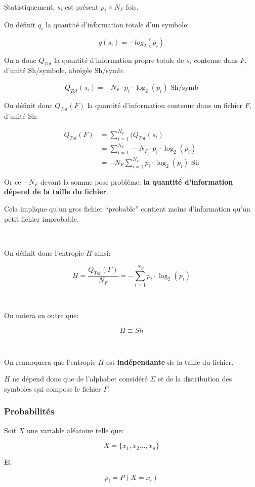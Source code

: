 \documentclass[a4paper,11pt]{article}
\newcommand{\ti}{\cdot}
\begin{document}
Statistiquement, $s_i$ est présent $p_i \times N_F$ fois.

On définit $q_i$ la quantité d'information totale d'un symbole:

$$ q(s_i) = -log_2(p_i) $$

On a donc $Q_{Tot}$ la quantité d'information propre totale de $s_i$ contenue
dans $F$, d'unité Sh/symbole, abrégée Sh/symb:

$$ Q_{Tot}(s_i) = -N_F \cdot p_i \cdot \log_2(p_i) \text{ Sh/symb}$$

On définit donc $Q_{Tot}(F)$ la quantité d'information contenue dans un fichier
$F$, d'unité Sh:

\begin{align*}
  Q_{Tot}(F) &= \sum_{i = 1}^{N_F}(Q_{Tot}(s_i) \\
             &= \sum_{i = 1}^{N_F} -N_F \ti p_i \ti \log_2(p_i) \\
             &= -N_F \sum_{i = 1}^{N_F}p_i \ti \log_2(p_i) \text{ Sh}
\end{align*}

Or ce $-N_F$ devant la somme pose problème:  \textbf{la quantité d'information
  dépend de la taille du fichier}.

Cela implique qu'un gros fichier ``probable'' contient moins d'information qu'un
petit fichier improbable.

\

On définit donc l'entropie $H$ ainsi:

$$ H = \frac{Q_{Tot}(F)}{N_F} = - \sum_{i = 1}^{N_F}p_i \ti \log_2(p_i)$$

\

On notera en outre que:

$$ H \equiv Sh $$

\

On remarquera que l'entropie $H$ est \textbf{indépendante} de la taille du
fichier.

$H$ ne dépend donc que de l'alphabet considéré $\Sigma$ et de la distribution
des symboles qui compose le fichier $F$.

\subsubsection{Probabilités}

Soit $X$ une variable aléatoire telle que:

$$ X = \{x_1, x_2 ..., x_n\}$$

Et

$$ p_i = P(X = x_i) $$
\end{document}

